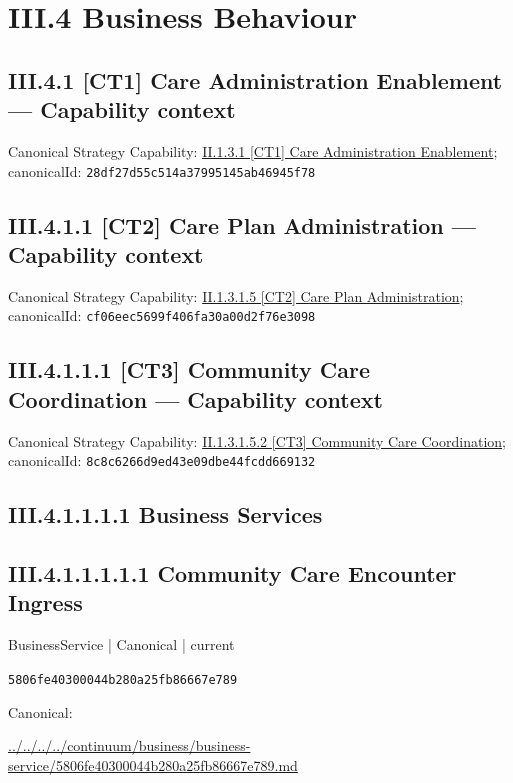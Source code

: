\documentclass[10pt,a4paper]{article}
\begin{document}
\section*{III.4 Business Behaviour}
\subsection*{III.4.1 [CT1] Care Administration Enablement — Capability context}
Canonical Strategy Capability: \hyperref[element-28df27d55c514a37995145ab46945f78]{II.1.3.1 [CT1] Care Administration Enablement}; canonicalId: \texttt{28df27d55c514a37995145ab46945f78}\par
\subsection*{III.4.1.1 [CT2] Care Plan Administration — Capability context}
Canonical Strategy Capability: \hyperref[element-cf06eec5699f406fa30a00d2f76e3098]{II.1.3.1.5 [CT2] Care Plan Administration}; canonicalId: \texttt{cf06eec5699f406fa30a00d2f76e3098}\par
\subsection*{III.4.1.1.1 [CT3] Community Care Coordination — Capability context}
Canonical Strategy Capability: \hyperref[element-8c8c6266d9ed43e09dbe44fcdd669132]{II.1.3.1.5.2 [CT3] Community Care Coordination}; canonicalId: \texttt{8c8c6266d9ed43e09dbe44fcdd669132}\par
\subsection*{III.4.1.1.1.1 Business Services}
\subsection*{III.4.1.1.1.1.1 Community Care Encounter Ingress}
\label{element-5806fe40300044b280a25fb86667e789}
{\small BusinessService | Canonical | current}\par
\texttt{5806fe40300044b280a25fb86667e789}\par
Canonical: \par
{\footnotesize\url{../../../../continuum/business/business-service/5806fe40300044b280a25fb86667e789.md}}\par
\end{document}
